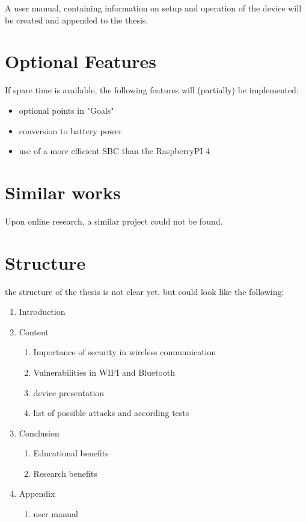 \documentclass{article}
\begin{document}
A user manual, containing information on setup and operation of the device will be created and appended to the thesis.


\section{Optional Features}
    If spare time is available, the following features will (partially) be implemented:

    \begin{itemize}
        \item optional points in "Goals"
        \item conversion to battery power
        \item use of a more efficient SBC than the RaspberryPI 4
    \end{itemize}

\section{Similar works}
Upon online research, a similar project could not be found.


\section{Structure}

the structure of the thesis is not clear yet, but could look like the following:

\begin{enumerate}
    \item Introduction
    \item Content
    \begin{enumerate}
        \item Importance of security in wireless communication
        \item Vulnerabilities in WIFI and Bluetooth
        \item device presentation
        \item list of possible attacks and according tests
    \end{enumerate}
    \item Conclusion
    \begin{enumerate}
        \item Educational benefits
        \item Research benefits
    \end{enumerate}
    \item Appendix
    \begin{enumerate}
        \item user manual
    \end{enumerate}
\end{enumerate}
\end{document}
